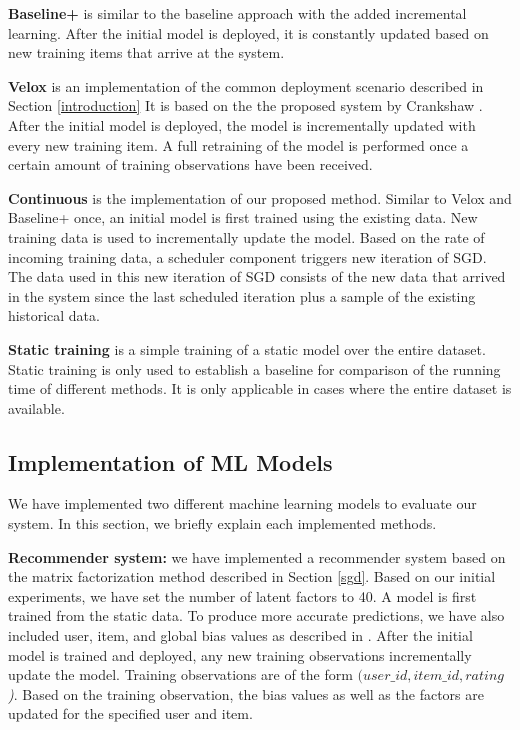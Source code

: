 \documentclass{vldb}
\begin{document}
\textbf{Baseline+} is similar to the baseline approach with the added incremental learning.
After the initial model is deployed, it is constantly updated based on new training items that arrive at the system.

\textbf{Velox} is an implementation of the common deployment scenario described in Section \ref{introduction}
It is based on the the proposed system by Crankshaw \cite{crankshaw2014missing}. 
After the initial model is deployed, the model is incrementally updated with every new training item.
A full retraining of the model is performed once a certain amount of training observations have been received.

\textbf{Continuous} is the implementation of our proposed method. 
Similar to Velox and Baseline+ once, an initial model is first trained using the existing data.
New training data is used to incrementally update the model.
Based on the rate of incoming training data, a scheduler component triggers new iteration of SGD.
The data used in this new iteration of SGD consists of the new data that arrived in the system since the last scheduled iteration plus a sample of the existing historical data.

\textbf{Static training} is a simple training of a static model over the entire dataset. 
Static training is only used to establish a baseline for comparison of the running time of different methods.
It is only applicable in cases where the entire dataset is available.

\subsection{Implementation of ML Models}
We have implemented two different machine learning models to evaluate our system.
In this section, we briefly explain each implemented methods.

\textbf{Recommender system:} we have implemented a recommender system based on the matrix factorization method described in Section \ref{sgd}.
Based on our initial experiments, we have set the number of latent factors to 40.
A model is first trained from the static data.
To produce more accurate predictions, we have also included user, item, and global bias values as described in \cite{koren2009matrix}.
After the initial model is trained and deployed, any new training observations incrementally update the model.
Training observations are of the form \textit{\((user\_id, item\_id, rating\))}.
Based on the training observation, the bias values as well as the factors are updated for the specified user and item.
\end{document}
